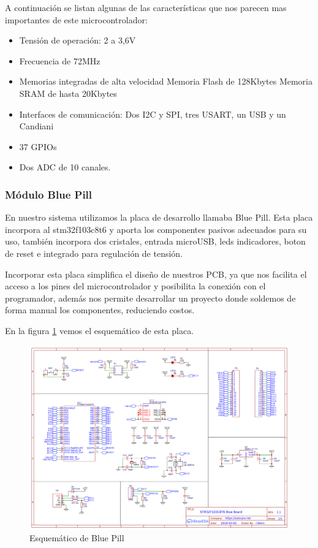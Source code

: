 A continuación se listan algunas de las características que nos parecen mas importantes de este microcontrolador:

\begin{itemize}
    \item Tensión de operación: 2 a 3,6V
    \item Frecuencia de 72MHz
    \item Memorias integradas de alta velocidad
    \subitem Memoria Flash de 128Kbytes
    \subitem Memoria SRAM de hasta 20Kbytes
    \item Interfaces de comunicación: Dos I2C y SPI, tres USART, un USB y un Candiani
    \item 37 GPIOs
    \item Dos ADC de 10 canales.
\end{itemize}

\subsubsection{Módulo Blue Pill}

En nuestro sistema utilizamos la placa de desarrollo llamaba Blue Pill. Esta placa incorpora al stm32f103c8t6 y aporta los componentes pasivos
adecuados para su uso, también incorpora dos cristales, entrada microUSB, leds indicadores, boton de reset e integrado para regulación de tensión. \par
Incorporar esta placa simplifica el diseño de nuestros PCB, ya que nos facilita el acceso a los pines del microcontrolador y posibilita la conexión
con el programador, además nos permite desarrollar un proyecto donde soldemos de forma manual los componentes, reduciendo costos.\par
En la figura \ref{fig:sch_bluepill} vemos el esquemático de esta placa.

\begin{figure}[htb]
	\centering
	\includegraphics[scale=0.4]{images/esquematico_bluepill.png}
    \caption{Esquemático de Blue Pill}
	\label{fig:sch_bluepill}
\end{figure}

